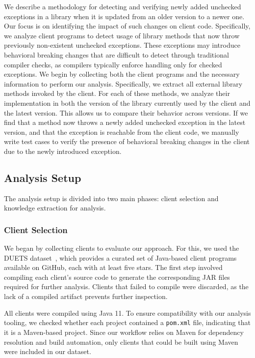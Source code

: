 We describe a methodology for detecting and verifying newly added unchecked exceptions in a library when it is updated from an older version to a newer one. Our focus is on identifying the impact of such changes on client code. Specifically, we analyze client programs to detect usage of library methods that now throw previously non-existent unchecked exceptions. These exceptions may introduce behavioral breaking changes that are difficult to detect through traditional compiler checks, as compilers typically enforce handling only for checked exceptions.
We begin by collecting both the client programs and the necessary information to perform our analysis. Specifically, we extract all external library methods invoked by the client. For each of these methods, we analyze their implementation in both the version of the library currently used by the client and the latest version. This allows us to compare their behavior across versions. If we find that a method now throws a newly added unchecked exception in the latest version, and that the exception is reachable from the client code, we manually write test cases to verify the presence of behavioral breaking changes in the client due to the newly introduced exception.
\subsection{Analysis Setup}

The analysis setup is divided into two main phases: client selection and knowledge extraction for analysis.

\subsubsection{Client Selection}

We began by collecting clients to evaluate our approach. For this, we used the DUETS dataset~\cite{durieux21:_duets}, which provides a curated set of Java-based client programs available on GitHub, each with at least five stars. The first step involved compiling each client's source code to generate the corresponding JAR files required for further analysis. Clients that failed to compile were discarded, as the lack of a compiled artifact prevents further inspection.

All clients were compiled using Java 11. To ensure compatibility with our analysis tooling, we checked whether each project contained a \texttt{pom.xml} file, indicating that it is a Maven-based project. Since our workflow relies on Maven for dependency resolution and build automation, only clients that could be built using Maven were included in our dataset.

